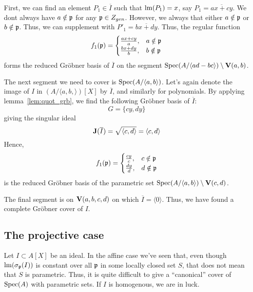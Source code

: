 \begin{example}
  First, we can find an element $P_{1} \in \overline I$ such that $\operatorname{lm}(P_{1}) = x$, say $P_{1} = \overline{ax + cy}$. We dont always have $a \notin \mathfrak p$ for any $\mathfrak p \in Z_{gen}$. However, we always that either $a \notin \mathfrak p$ or $b \notin \mathfrak p$. Thus, we can supplement with $P'_{1} = \overline{bx + dy}$. Thus, the regular function
  \[f_{1}(\mathfrak p) =
    \begin{cases}
      \frac{ax + cy}{a}, & a \notin \mathfrak p \\
      \frac{bx + dy}{b}, & b \notin \mathfrak p
    \end{cases}
  \]
  forms the reduced Gröbner basis of $\overline I$ on the segment $\operatorname{Spec}(A/\langle ad - bc \rangle) \setminus \operatorname{\mathbf V}(a, b)$.

  The next segment we need to cover is $\operatorname{Spec}(A/\langle a, b \rangle)$. Let's again denote the image of $I$ in $(A/\langle a, b, \rangle)[X]$ by $\overline I$, and similarly for polynomials. By applying lemma~\ref{lem:quot_grb}, we find the following Gröbner basis of $\overline I$:
  \[G = \{cy, dy\}\]
  giving the singular ideal
  \[\operatorname{\mathbf J}(\overline I) = \sqrt{\langle c, d \rangle} = \langle c, d \rangle\]
  Hence,
  \[f_{1}(\mathfrak p) =
    \begin{cases}
      \frac{cy}{c}, & c \notin \mathfrak p \\
      \frac{dy}{d}, & d \notin \mathfrak p
    \end{cases}
  \]
  is the reduced Gröbner basis of the parametric set $\operatorname{Spec}(A/\langle a, b \rangle) \setminus \operatorname{\mathbf V}(c, d)$.

  The final segment is on $\operatorname{\mathbf V}(a, b, c, d)$ on which $\overline I = \langle 0 \rangle$. Thus, we have found a complete Gröbner cover of $I$.
\end{example}


\subsection{The projective case}
Let $I \subset A[X]$ be an ideal. In the affine case we've seen that, even though $\operatorname{lm}(\sigma_{\mathfrak p}(I))$ is constant over all $\mathfrak p$ in some locally closed set $S$, that does not mean that $S$ is parametric. Thus, it is quite difficult to give a ``canonical'' cover of $\operatorname{Spec}(A)$ with parametric sets. If $I$ is homogenous, we are in luck.

